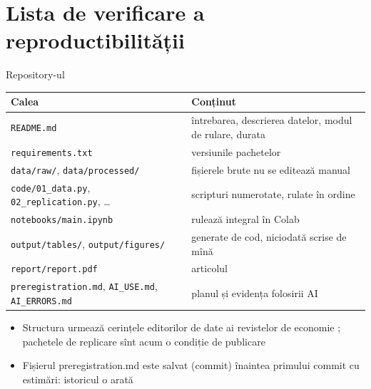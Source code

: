 \section{Lista de verificare a reproductibilității}

\begin{frame}{Repository-ul}
\itemsize{\small}
\begin{center}
\scriptsize
\begin{tabular}{>{\raggedright\arraybackslash}p{5.4cm}>{\raggedright\arraybackslash}p{6.8cm}}
\toprule
\textbf{Calea} & \textbf{Conținut} \\
\midrule
\texttt{README.md} & întrebarea, descrierea datelor, modul de rulare, durata \\
\texttt{requirements.txt} & versiunile pachetelor \\
\texttt{data/raw/}, \texttt{data/processed/} & fișierele brute nu se editează manual \\
\texttt{code/01\_data.py}, \texttt{02\_replication.py}, \dots & scripturi numerotate, rulate în ordine \\
\texttt{notebooks/main.ipynb} & rulează integral în Colab \\
\texttt{output/tables/}, \texttt{output/figures/} & generate de cod, niciodată scrise de mînă \\
\texttt{report/report.pdf} & articolul \\
\texttt{preregistration.md}, \texttt{AI\_USE.md}, \texttt{AI\_ERRORS.md} & planul și evidența folosirii AI \\
\bottomrule
\end{tabular}
\end{center}

\vspace{2mm}
\begin{itemize}
    \item Structura urmează cerințele editorilor de date ai revistelor de economie ; pachetele de replicare sînt acum o condiție de publicare 
    \item Fișierul preregistration.md este salvat (commit) înaintea primului commit cu estimări: istoricul o arată
\end{itemize}
\end{frame}

